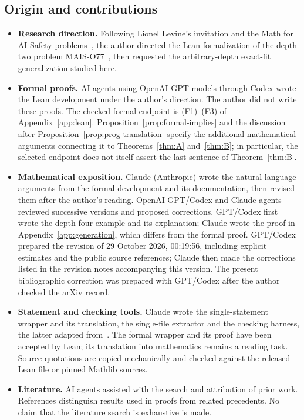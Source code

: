 \documentclass[11pt,a4paper]{article}
\theoremstyle{definition}
\theoremstyle{remark}
\numberwithin{equation}{section}
\providecommand{\DIFaddtex}[1]{{\protect\color{blue}#1}} %
\providecommand{\DIFaddbegin}{} %
\providecommand{\DIFaddend}{} %
\providecommand{\DIFadd}[1]{\texorpdfstring{\DIFaddtex{#1}}{#1}} %
\begin{document}
\subsection*{Origin and contributions}
\begin{itemize}
\item \textbf{Research direction.} Following Lionel Levine's invitation and the Math for AI Safety problems~\cite{levine-mais,mais-repo}, the author directed the Lean formalization of the depth-two problem MAIS-O77~\cite{mais-o77,feld-o77}, then requested the arbitrary-depth exact-fit generalization studied here.
\item \textbf{Formal proofs.} AI agents using OpenAI GPT models through Codex wrote the Lean development under the author's direction. The author did not write these proofs. The checked formal endpoint is (F1)--(F3) of Appendix~\ref{app:lean}. Proposition~\ref{prop:formal-implies} and the discussion after Proposition~\ref{prop:prog-translation} specify the additional mathematical arguments connecting it to Theorems~\ref{thm:A} and~\ref{thm:B}; in particular, the selected endpoint does not itself assert the last sentence of Theorem~\ref{thm:B}.
\item \textbf{Mathematical exposition.} Claude (Anthropic) wrote the natural-language arguments from the formal development and its documentation, then revised them after the author's reading. OpenAI GPT/Codex and Claude agents reviewed successive versions and proposed corrections. GPT/Codex first wrote the depth-four example and its explanation; Claude wrote the proof in Appendix~\ref{app:generation}, which differs from the formal proof. GPT/Codex prepared the revision of 29 October 2026, 00:19:56, including explicit estimates and the public source references; Claude then made the corrections listed in the revision notes accompanying this version. \DIFaddbegin \DIFadd{The present bibliographic correction was prepared with GPT/Codex after the author checked the arXiv record.
}\DIFaddend \item \textbf{Statement and checking tools.} Claude wrote the single-statement wrapper and its translation, the single-file extractor and the checking harness, the latter adapted from~\cite{feld-o77}. The formal wrapper and its proof have been accepted by Lean; its translation into mathematics remains a reading task. Source quotations are copied mechanically and checked against the released Lean file or pinned Mathlib sources.
\item \textbf{Literature.} AI agents assisted with the search and attribution of prior work. References distinguish results used in proofs from related precedents. No claim that the literature search is exhaustive is made.
\end{itemize}
\end{document}
